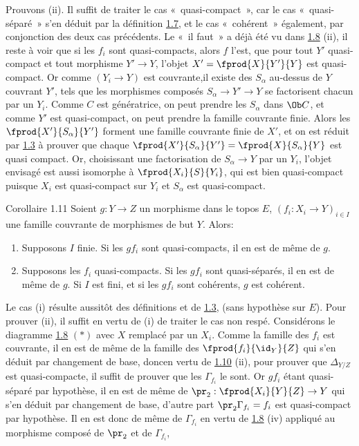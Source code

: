 Prouvons (ii). Il suffit de traiter le cas « quasi-compact », car
le cas « quasi-séparé » s'en déduit par la définition \hyperref[VI.def1.7]{1.7}, et le
cas « cohérent » également, par conjonction des deux cas
précédents. Le « il faut » a déjà été vu dans \hyperref[VI.prop1.8]{1.8} (ii), il reste à
voir que si les $f_i$ sont quasi-compacts, alors $f$ l'est, \ie que
pour tout $Y'$ quasi-compact et tout morphisme $Y'\to Y$, l'objet $X'=
\fprod{X}{Y'}{Y}$ est quasi-compact. Or comme $(Y_i \to Y)$ est
couvrante,\pageoriginale il existe des $S_{\alpha}$ au-dessus de $Y$
couvrant $Y'$, tels que les morphismes composés $S_{\alpha}\to Y'\to
Y$ se factorisent chacun par un $Y_{i}$. Comme $C$ est génératrice, on
peut prendre les $S_{\alpha}$ dans $\Ob C$, et
comme $Y'$ est
quasi-compact, on peut prendre la famille couvrante finie. Alors les
$\fprod{X'}{S_{\alpha}}{Y'}$ forment une famille couvrante finie de
$X'$, et on est réduit par \hyperref[VI.prop1.3]{1.3} à prouver que chaque
$\fprod{X'}{S_{\alpha}}{Y'} = \fprod{X}{S_{\alpha}}{Y}$ est quasi
compact. Or, choisissant une factorisation de $S_{\alpha} \to Y$ par
un $Y_i$, l'objet envisagé est aussi isomorphe à
$\fprod{X_i}{S}{Y_i}$, qui est bien quasi-compact puisque $X_i$ est
quasi-compact sur $Y_i$ et $S_{\alpha}$ est quasi-compact.

\begin{enonce*}{Corollaire 1.11}
Soient $g : Y \to Z$ un morphisme dans le topos $E$, $(f_i : X_i \to
Y)_{i \in I}$ une famille couvrante de morphismes de but $Y$. Alors:
\begin{enumerate}
\renewcommand{\theenumi}{\roman{enumi}}
\renewcommand{\labelenumi}{(\theenumi)}
\item Supposons $I$ finie. Si les $gf_i$ sont quasi-compacts, il en
  est de même de $g$.

\item Supposons les $f_i$ quasi-compacts. Si les $gf_i$ sont
  quasi-séparés, il en est de même de $g$. Si $I$ est fini, et si les
  $gf_i$ sont cohérents, $g$ est cohérent.
\end{enumerate}
\end{enonce*}

Le cas (i) résulte aussitôt des définitions et de \hyperref[VI.prop1.3]{1.3},
(sans hypothèse sur $E$). Pour prouver (ii), il suffit en vertu de
(i) de traiter le cas non respé. Considérons le diagramme
\hyperref[VI.prop1.8]{1.8} $(\ast)$ avec $X$ remplacé par un $X_i$. Comme la
famille des $f_i$ est couvrante, il en est de même de la famille des
$\fprod{f_i}{\id_Y}{Z}$ qui s'en déduit par changement de base,
donc\pageoriginale en vertu de \hyperref[VI.prop1.10]{1.10} (ii), pour prouver
que $\Delta_{Y /Z}$ est quasi-compacte, il suffit de prouver que les
$\Gamma_{f_i}$ le sont. Or $gf_i$ étant quasi-séparé par hypothèse,
il en est de même de $\pr_2 : \fprod{X_i}{Y}{Z} \to Y$ qui s'en
déduit par changement de base, d'autre part $\pr_2 \Gamma_{f_i} =
f_i$ est quasi-compact par hypothèse. Il en est donc de même de
$\Gamma_{f_i}$ en vertu de \hyperref[VI.prop1.8]{1.8} (iv) appliqué au
morphisme composé de $\pr_2$ et de $\Gamma_{f_i}$, \cqfd

